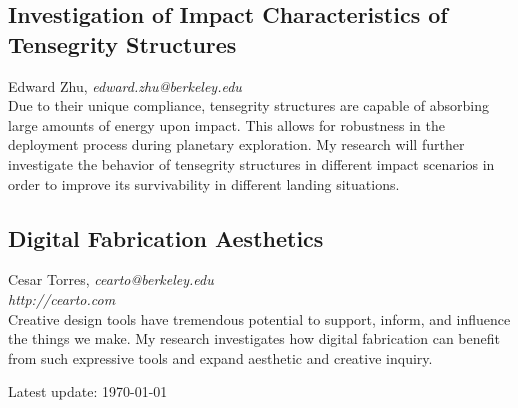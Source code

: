\documentclass[foldmark,10pt,a4paper,notumble]{leaflet}
\newcommand{\name}[1]{#1,}
\newcommand{\email}[1]{\emph{#1}}
\newcommand{\website}[1]{\\\emph{#1}\\[3pt]}
\newcommand{\nowebsite}[1]{\\[3pt]}
\begin{document}
\subsection{Investigation of Impact Characteristics of Tensegrity Structures}
\name{Edward Zhu}
\email{edward.zhu@berkeley.edu}
\nowebsite{}
Due to their unique compliance, tensegrity structures are capable of absorbing large amounts of energy upon impact. This allows for robustness in the deployment process during planetary exploration. My research will further investigate the behavior of tensegrity structures in different impact scenarios in order to improve its survivability in different landing situations.

\subsection{Digital Fabrication Aesthetics}
\name{Cesar Torres}
\email{cearto@berkeley.edu}
\website{http://cearto.com}
Creative design tools have tremendous potential to support, inform, and influence the things we make. My research investigates how digital fabrication can benefit from such expressive tools and expand aesthetic and creative inquiry.

\vspace{12pt}
Latest update: \today
\end{document}
